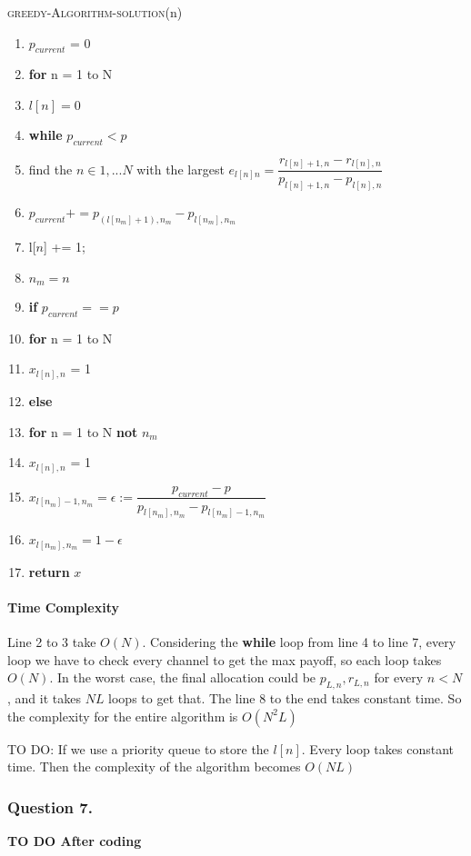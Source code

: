 \documentclass[11pt, oneside]{report}
\begin{document}
\noindent\textsc{greedy-Algorithm-solution}(n)
\begin{enumerate}[1\ ]
\setlength{\topsep}{0.05ex}
\setlength{\itemsep}{0.05ex}
\item $p_{current}$ = 0 
\item \textbf{for} n = 1 to N
\item \qquad $l[n] = 0$
\item \textbf{while} $p_{current} < p$  
\item \qquad  find the $n \in {1,...N}$ with the largest $e_{l[n]n} = \dfrac{r_{l[n]+1,n} - r_{l[n],n}}{p_{l[n]+1,n} - p_{l[n],n}}$ 
\item \qquad  $p_{current} += p_{(l[n_{m}] + 1), n_{m}} - p_{l[n_{m}], n_{m}}$
\item \qquad  l[$n$] += 1;
\item \qquad $n_m = n$
\item \textbf{if} $p_{current} == p$
\item \qquad \textbf{for} n = 1 to N
\item \qquad \qquad $x_{l[n],n}$ = 1
\item \textbf{else} 
\item \qquad \textbf{for} n = 1 to N \textbf{not} $n_m$
\item \qquad \qquad $x_{l[n],n}$ = 1
\item \qquad $x_{l[n_m] - 1,n_m} = \epsilon := \dfrac{p_{current} - p}{p_{l[n_m],n_m} - p_{l[n_m]-1,n_m}}$
\item \qquad $x_{l[n_m],n_m} = 1 - \epsilon$
\item \textbf{return} $x$
\end{enumerate}

\paragraph{Time Complexity} Line 2 to 3 take $O(N)$. Considering the \textbf{while} loop from line 4 to line 7, every loop we have to check every channel to get the max payoff, so each loop takes $O(N)$. In the worst case, the final allocation could be $p_{L,n}, r_{L,n}$ for every $n < N$, and it takes $NL$ loops to get that. The line 8 to the end  takes constant time. So the complexity for the entire algorithm is $O(N^2L)$  

TO DO: If we use a priority queue to store the $l[n]$. Every loop takes constant time. Then the complexity of the algorithm becomes $O(N L)$

\subsubsection{Question 7. }
\textbf{ TO DO After coding}
\end{document}
